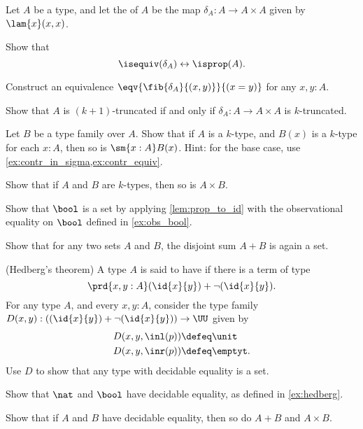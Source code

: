 \begin{exercises}
\item \label{ex:diagonal}Let $A$ be a type, and let the  of $A$ be the map $\delta_A:A\to A\times A$ given by $\lam{x}(x,x)$. 
\begin{subexenum}
\item Show that
\begin{equation*}
{\isequiv(\delta_A)}\leftrightarrow{\isprop(A)}.
\end{equation*}
\item Construct an equivalence $\eqv{\fib{\delta_A}{(x,y)}}{(x=y)}$ for any $x,y:A$.
\item Show that $A$ is $(k+1)$-truncated if and only if $\delta_A:A\to A\times A$ is $k$-truncated.
\end{subexenum}
\item \label{ex:istrunc_sigma}
\begin{subexenum}
\item Let $B$ be a type family over $A$. Show that if $A$ is a $k$-type, and $B(x)$ is a $k$-type for each $x:A$, then so is $\sm{x:A}B(x)$. Hint: for the base case, use \cref{ex:contr_in_sigma,ex:contr_equiv}.
\item Show that if $A$ and $B$ are $k$-types, then so is $A\times B$.
\end{subexenum}
\item \label{ex:eq_bool}Show that $\bool$ is a set by applying \cref{lem:prop_to_id} with the observational equality on $\bool$ defined in \cref{ex:obs_bool}.
\item \label{ex:set_coprod}Show that for any two sets $A$ and $B$, the disjoint sum $A+B$ is again a set.
\item \label{ex:hedberg}(Hedberg's theorem) A type $A$ is said to have  if there is a term of type
\begin{equation*}
\prd{x,y:A} (\id{x}{y})+\neg(\id{x}{y}).
\end{equation*}
For any type $A$, and every $x,y:A$, consider the type family $D(x,y):((\id{x}{y})+\neg(\id{x}{y}))\to\UU$ given by
\begin{align*}
D(x,y,\inl(p)) & \defeq \unit \\
D(x,y,\inr(p)) & \defeq \emptyt.
\end{align*}
Use $D$ to show that any type with decidable equality is a set.
\item Show that $\nat$ and $\bool$ have decidable equality, as defined in \autoref{ex:hedberg}.
\item Show that if $A$ and $B$ have decidable equality, then so do $A+B$ and $A\times B$.

\end{exercises}
